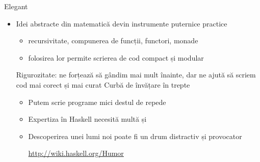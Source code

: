 \documentclass[xcolor=pdftex,romanian,colorlinks]{beamer}
\begin{document}
\begin{frame}{Elegant}
\begin{itemize}
\item Idei abstracte din matematică devin instrumente puternice practice
\begin{itemize}
\item recursivitate, compunerea de funcții, functori, monade
\item folosirea lor permite scrierea de cod compact și modular
\end{itemize}
\vitem Rigurozitate:  ne forțează să gândim mai mult înainte, dar ne ajută să scriem cod mai corect și mai curat
\vitem Curbă de învățare în trepte
\begin{itemize}
\item Putem scrie programe mici destul de repede
\item Expertiza în Haskell necesită multă  și 
\item Descoperirea unei lumi noi poate fi un drum distractiv și provocator

\url{http://wiki.haskell.org/Humor}
\end{itemize}
\end{itemize}
\end{frame}
\end{document}
